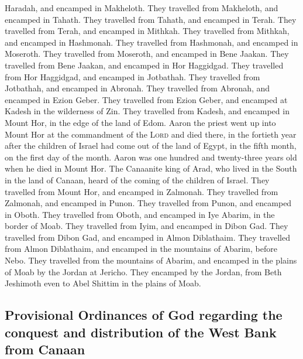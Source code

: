 Haradah, and encamped in Makheloth.  They travelled from
Makheloth, and encamped in Tahath.  They travelled from
Tahath, and encamped in Terah.  They travelled from
Terah, and encamped in Mithkah.  They travelled from
Mithkah, and encamped in Hashmonah.  They travelled from
Hashmonah, and encamped in Moseroth.  They travelled from
Moseroth, and encamped in Bene Jaakan.  They travelled
from Bene Jaakan, and encamped in Hor Haggidgad.  They
travelled from Hor Haggidgad, and encamped in Jotbathah. 
They travelled from Jotbathah, and encamped in Abronah. 
They travelled from Abronah, and encamped in Ezion Geber.
 They travelled from Ezion Geber, and encamped at Kadesh
in the wilderness of Zin.  They travelled from Kadesh,
and encamped in Mount Hor, in the edge of the land of Edom.
 Aaron the priest went up into Mount Hor at the
commandment of the \textsc{Lord} and died there, in the fortieth year
after the children of Israel had come out of the land of Egypt, in the
fifth month, on the first day of the month.  Aaron was
one hundred and twenty-three years old when he died in Mount Hor.
 The Canaanite king of Arad, who lived in the South in
the land of Canaan, heard of the coming of the children of Israel.
 They travelled from Mount Hor, and encamped in Zalmonah.
 They travelled from Zalmonah, and encamped in Punon.
 They travelled from Punon, and encamped in Oboth.
 They travelled from Oboth, and encamped in Iye Abarim,
in the border of Moab.  They travelled from Iyim, and
encamped in Dibon Gad.  They travelled from Dibon Gad,
and encamped in Almon Diblathaim.  They travelled from
Almon Diblathaim, and encamped in the mountains of Abarim, before Nebo.
 They travelled from the mountains of Abarim, and
encamped in the plains of Moab by the Jordan at Jericho. 
They encamped by the Jordan, from Beth Jeshimoth even to Abel Shittim in
the plains of Moab.

\hypertarget{provisional-ordinances-of-god-regarding-the-conquest-and-distribution-of-the-west-bank-from-canaan}{%
\subsection{Provisional Ordinances of God regarding the conquest and
distribution of the West Bank from
Canaan}\label{provisional-ordinances-of-god-regarding-the-conquest-and-distribution-of-the-west-bank-from-canaan}}

